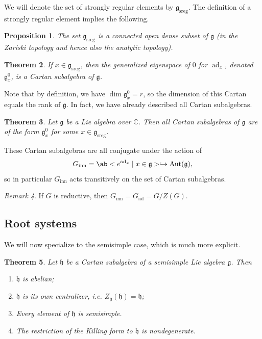 \documentclass{amsart}
\newtheorem{thm}{Theorem}[section]
\newtheorem{prop}[thm]{Proposition}
\theoremstyle{definition}
\theoremstyle{remark}
\newtheorem{rmk}[thm]{Remark}
\theoremstyle{plain}
\theoremstyle{definition}
\theoremstyle{remark}
\newcommand{\C}{\mathbb{C}}
\newcommand{\g}{\mathfrak{g}}
\newcommand{\h}{\mathfrak{h}}
\newcommand{\mr}[1]{\mathrm{#1}}
\newcommand{\on}[1]{\operatorname{#1}}
\newcommand{\1}{\mathbf{1}}
\newcommand{\2}{\mathbf{2}}
\newcommand{\3}{\mathbf{3}}
\DeclareMathOperator{\ad}{ad}
\DeclareMathOperator{\Aut}{Aut}
\begin{document}
We will denote the set of strongly regular elements by \(\g_{\on{sreg}}\). The definition of a strongly regular element implies the following.

\begin{prop}
    The set \(\g_{\on{sreg}}\) is a connected open dense subset of \(\g\) (in the Zariski topology and hence also the analytic topology).
\end{prop}

\begin{thm}
    If \(x \in \g_{\on{sreg}}\), then the generalized eigenspace of \(0\) for \(\ad_x\), denoted \(\g_x^0\), is a Cartan subalgebra of \(\g\).
\end{thm}

Note that by definition, we have \(\dim \g_x^0 = r\), so the dimension of this Cartan equals the rank of \(\g \). In fact, we have already described all Cartan subalgebras.

\begin{thm}
    Let \(\g\) be a Lie algebra over \(\C\). Then all Cartan subalgebras of \(\g\) are of the form \(\g_x^0\) for some \(x \in \g_{\on{sreg}}\).
\end{thm}

These Cartan subalgebras are all conjugate under the action of
\[ G_{\mr{inn}} = \ab<e^{\ad_x} \mid x \in \g> \hookrightarrow \Aut(\g), \]
so in particular \(G_{\mr{inn}}\) acts transitively on the set of Cartan subalgebras.

\begin{rmk}
    If \(G\) is reductive, then \(G_{\mr{inn}} = G_{\on{ad}} = G/Z(G)\).
\end{rmk}

\subsection{Root systems}%
\label{sub:Root systems}

We will now specialize to the semisimple case, which is much more explicit. 

\begin{thm}
    Let \(\h\) be a Cartan subalgebra of a semisimple Lie algebra \(\g\). Then
    \begin{enumerate}
        \item \(\h\) is abelian;
        \item \(\h\) is its own centralizer, i.e. \(Z_{\g}(\h) = \h\);
        \item Every element of \(\h\) is semisimple.
        \item The restriction of the Killing form to \(\h\) is nondegenerate.
    \end{enumerate}
\end{thm}
\end{document}
